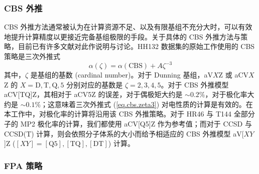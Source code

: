 \subsubsection{CBS 外推}

CBS 外推方法通常被认为在计算资源不足、以及有限基组不充分大时，可以有效地提升计算精度以更接近完备基组极限的手段。关于具体的 CBS 外推方法与策略，目前已有许多文献对此作说明与讨论\cite{Nyden-Petersson.JCP.1981, Petersson-Mantzaris.JCP.1988, Dunning-Dunning.JCP.1989, Peterson-Dunning.JCP.1994, Jensen-Jensen.TCA.2005, Karton-Martin.TCA.2006, Truhlar-Truhlar.CPL.1998, Klopper-Kutzelnigg.JMST.1986, Kutzelnigg-Morgan.JCP.1992, Martin-Martin.CPL.1996, Helgaker-Noga.JCP.1997, Halkier-Wilson.CPL.1998, Halkier-Olsen.CPL.1999}。HH132 数据集的原始工作使用的 CBS 策略是三次外推式\cite{Hait-Head-Gordon.PCCP.2018}
\begin{equation}
    \label{eq.cbs.zeta3}
    \alpha(\zeta) = \alpha(\text{CBS}) + A \zeta^{-3}
\end{equation}
其中，$\zeta$ 是基组的基数 (cardinal number)。对于 Dunning 基组，aV$X$Z 或 aCV$X$Z 的 $X = \mathrm{D, T, Q, 5}$ 分别对应的基数是 $\zeta = 2, 3, 4, 5$。对于 CBS 外推模型 aCV[TQ]Z，其相对于 aCV5Z 的误差，对于偶极矩大约是 $\sim 0.2\%$\cite{Hait-Head-Gordon.JCTC.2018, Halkier-Joergensen.JCP.1999}，对于极化率大约是 $\sim 0.1\%$\cite{Hait-Head-Gordon.PCCP.2018}；这意味着三次外推式 (\ref{eq.cbs.zeta3}) 对电性质的计算是有效的。在本工作中，对极化率的计算将沿用该 CBS 外推策略。对于 HR46 与 T144 全部分子的 MP2 极化率的计算，我们都使用 aCV[Q5]Z 作为参考值；而对于 CCSD 与 CCSD(T) 计算，则会依照分子体系的大小而给予相适应的 CBS 外推模型 aV[$XY$]Z ($[XY] = \mathrm{[Q5], [TQ], [DT]}$) 计算。

\subsubsection{FPA 策略}

